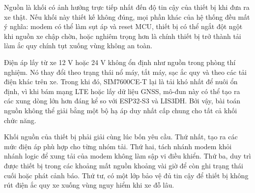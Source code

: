 \documentclass[a4paper]{extarticle}
\begin{document}
Nguồn là khối có ảnh hưởng trực tiếp nhất đến độ tin cậy của thiết bị khi
đưa ra xe thật. Nếu khối này thiết kế không đúng, mọi phần khác của hệ
thống đều mất ý nghĩa: modem có thể làm sụt áp và reset MCU, thiết bị có
thể ngắt đột ngột khi nguồn xe chập chờn, hoặc nghiêm trọng hơn là chính
thiết bị trở thành tải làm ắc quy chính tụt xuống vùng không an toàn.

Điện áp lấy từ xe 12 V hoặc 24 V không ổn định như nguồn trong phòng thí
nghiệm. Nó thay đổi theo trạng thái nổ máy, tắt máy, sạc ắc quy và theo
các tải điện khác trên xe. Trong khi đó, SIM7600CE-T lại là tải khó nhất
để nuôi ổn định, vì khi bám mạng LTE hoặc lấy dữ liệu GNSS, mô-đun này có
thể tạo ra các xung dòng lớn hơn đáng kể so với ESP32-S3 và LIS3DH. Bởi
vậy, bài toán nguồn không thể giải bằng một bộ hạ áp duy nhất cấp chung
cho tất cả khối chức năng.

Khối nguồn của thiết bị phải giải cùng lúc bốn yêu cầu. Thứ nhất, tạo ra
các mức điện áp phù hợp cho từng nhóm tải. Thứ hai, tách nhánh modem khỏi
nhánh logic để xung tải của modem không làm sập vi điều khiển. Thứ ba, duy
trì được thiết bị trong các khoảng mất nguồn khoảng vài giờ để còn ghi trạng thái
cuối hoặc phát cảnh báo. Thứ tư, có một lớp bảo vệ đủ tin cậy để thiết bị
không rút điện ắc quy xe xuống vùng nguy hiểm khi xe đỗ lâu.
\end{document}
